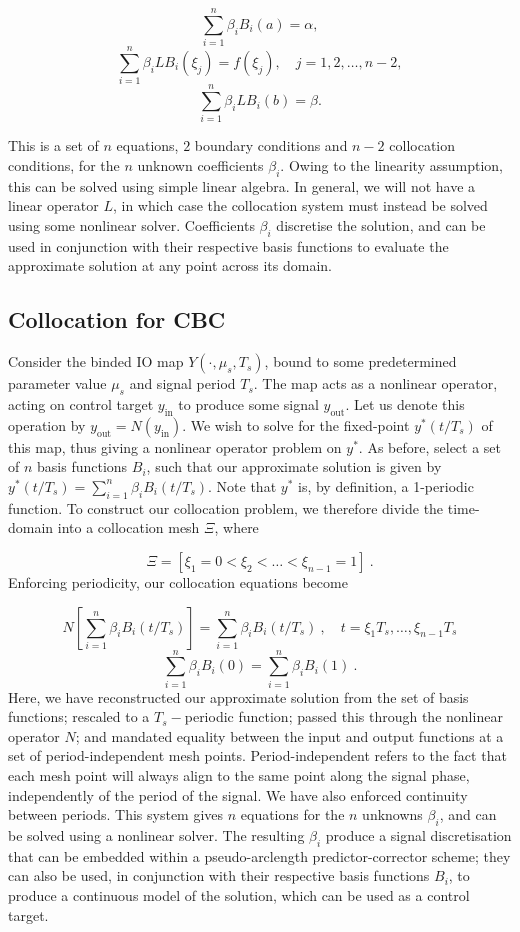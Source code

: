 \documentclass[11pt]{article}
\begin{document}
\[\sum_{i=1}^n \beta_i B_i(a) = \alpha,\]
\[\sum_{i=1}^n \beta_i LB_i(\xi_j) = f(\xi_j),\quad j=1,2,\dots,n-2,\]
\[\sum_{i=1}^n \beta_i LB_i(b) = \beta.\]

This is a set of \(n\) equations, \(2\) boundary conditions and \(n-2\) collocation conditions, for the \(n\) unknown coefficients \(\beta_i\).
Owing to the linearity assumption, this can be solved using simple linear algebra.
In general, we will not have a linear operator \(L\), in which case the collocation system must instead be solved using some nonlinear solver.
Coefficients \(\beta_i\) discretise the solution, and can be used in conjunction with their respective basis functions to evaluate the approximate solution at any point across its domain.

\subsection{Collocation for CBC}
\label{sec:orge0e67cb}

Consider the binded IO map \(Y(\cdot, \mu_s, T_s)\), bound to some predetermined parameter value \(\mu_s\) and signal period \(T_s\).
The map acts as a nonlinear operator, acting on control target \(y_\text{in}\) to produce some signal \(y_\text{out}\).
Let us denote this operation by \(y_\text{out} = N(y_\text{in})\).
We wish to solve for the fixed-point \(y^*(t/T_s)\) of this map, thus giving a nonlinear operator problem on \(y^*\).
As before, select a set of \(n\) basis functions \(B_i\), such that our approximate solution is given by \(y^*(t/T_s) = \sum_{i=1}^{n}\beta_iB_i(t/T_s)\).
Note that \(y^*\) is, by definition, a 1-periodic function.
To construct our collocation problem, we therefore divide the time-domain into a collocation mesh \(\Xi\), where

\[\Xi = [\xi_1 = 0 < \xi_2 < \dots < \xi_{n-1} = 1]~.\]
Enforcing periodicity, our collocation equations become

\[N\left[\sum_{i=1}^{n}\beta_iB_i(t/T_s)\right] = \sum_{i=1}^{n}\beta_iB_i(t/T_s)~,\quad t=\xi_1T_s,\dots,\xi_{n-1}T_s\]
\[\sum_{i=1}^{n}\beta_iB_i(0) =  \sum_{i=1}^{n}\beta_iB_i(1)~.\]
Here, we have reconstructed our approximate solution from the set of basis functions; rescaled to a \(T_s-\)periodic function; passed this through the nonlinear operator \(N\); and mandated equality between the input and output functions at a set of period-independent mesh points.
Period-independent refers to the fact that each mesh point will always align to the same point along the signal phase, independently of the period of the signal.
We have also enforced continuity between periods.
This system gives \(n\) equations for the \(n\) unknowns \(\beta_i\), and can be solved using a nonlinear solver.
The resulting \(\beta_i\) produce a signal discretisation that can be embedded within a pseudo-arclength predictor-corrector scheme; they can also be used, in conjunction with their respective basis functions \(B_i\), to produce a continuous model of the solution, which can be used as a control target.
\end{document}
